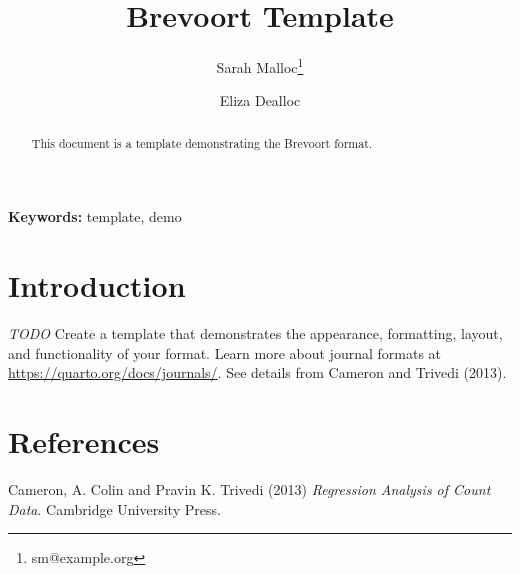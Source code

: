 \documentclass[
abstract=on,
numbers=endperiod,
letterpaper,
]{scrartcl}
\title{Brevoort Template}
\author[1,2]{Sarah Malloc\thanks{sm@example.org}}
\author[3]{Eliza Dealloc}
\affil[1]{An Organization}
\affil[2]{A second affilication}
\affil[3]{Another Affiliation}
\newlength{\cslhangindent}
\newlength{\cslentryspacingunit} %
\newenvironment{CSLReferences}[2] %
 {%
  \setlength{\parindent}{0pt}
  \ifodd #1
  \let\oldpar\par
  \def\par{\hangindent=\cslhangindent\oldpar}
  \fi
  \setlength{\parskip}{#2\cslentryspacingunit}
 }%
 {}
\begin{document}
\def\spacingset#1{\renewcommand{\baselinestretch}%
{#1}\small\normalsize} \spacingset{1}



  \maketitle
{}

\bigskip

\begin{abstract}
This document is a template demonstrating the Brevoort format.
\end{abstract}


\noindent\textbf{Keywords:} template, demo

\vfill
\clearpage

\spacingset{1.9} %
\parindent=20pt
\parskip=0pt
\ifdefined\Shaded\renewenvironment{Shaded}{\begin{tcolorbox}[frame hidden, borderline west={3pt}{0pt}{shadecolor}, interior hidden, breakable, enhanced, sharp corners, boxrule=0pt]}{\end{tcolorbox}}\fi

\hypertarget{sec-intro}{%
\section{Introduction}\label{sec-intro}}

\emph{TODO} Create a template that demonstrates the appearance,
formatting, layout, and functionality of your format. Learn more about
journal formats at \url{https://quarto.org/docs/journals/}. See details
from Cameron and Trivedi (2013).

\clearpage
\singlespacing
\section*{References}

\hypertarget{refs}{}
\begin{CSLReferences}{1}{0}
\leavevmode{}%
Cameron, A. Colin and Pravin K. Trivedi (2013) \emph{Regression Analysis
of Count Data}. Cambridge University Press.

\end{CSLReferences}

\clearpage
\end{document}
